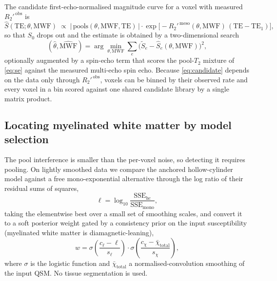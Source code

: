 \documentclass[AMA,STIX2COL,Linenumberson]{MRM}
\begin{document}
The candidate first-echo-normalised magnitude curve for a voxel with measured $R_2'^{\,\mathrm{obs}}$ is
\begin{equation}
\hat{S}(\mathrm{TE};\theta,\mathrm{MWF}) \;\propto\; \big|\,\mathrm{pools}(\theta,\mathrm{MWF},\mathrm{TE})\,\big| \cdot
\exp\!\big[-R_2'^{\,\mathrm{meso}}(\theta,\mathrm{MWF})\,(\mathrm{TE}-\mathrm{TE}_1)\big],
\label{eq:candidate}
\end{equation}
so that $S_0$ drops out and the estimate is obtained by a two-dimensional search
\begin{equation}
(\hat\theta,\widehat{\mathrm{MWF}}) = \arg\min_{\theta,\mathrm{MWF}} \sum_e \Big( \tilde{S}_e - \hat{S}_e(\theta,\mathrm{MWF}) \Big)^{2},
\label{eq:fit}
\end{equation}
optionally augmented by a spin-echo term that scores the pool-$T_2$ mixture of \eqref{eq:se} against the measured multi-echo spin echo. Because \eqref{eq:candidate} depends on the data only through $R_2'^{\,\mathrm{obs}}$, voxels can be binned by their observed rate and every voxel in a bin scored against one shared candidate library by a single matrix product.

\subsection{Locating myelinated white matter by model selection}
\label{sec:theory-wm}

The pool interference is smaller than the per-voxel noise, so detecting it requires pooling. On lightly smoothed data we compare the anchored hollow-cylinder model against a free mono-exponential alternative through the log ratio of their residual sums of squares,
\begin{equation}
\ell = \log_{10} \frac{\mathrm{SSE}_{\mathrm{hc}}}{\mathrm{SSE}_{\mathrm{mono}}},
\label{eq:lr}
\end{equation}
taking the elementwise best over a small set of smoothing scales, and convert it to a soft posterior weight gated by a consistency prior on the input susceptibility (myelinated white matter is diamagnetic-leaning),
\begin{equation}
w = \sigma\!\left(\frac{c_\ell-\ell}{s_\ell}\right)\cdot \sigma\!\left(\frac{c_\chi - \bar\chi_{\mathrm{total}}}{s_\chi}\right),
\label{eq:weight}
\end{equation}
where $\sigma$ is the logistic function and $\bar\chi_{\mathrm{total}}$ a normalised-convolution smoothing of the input QSM. No tissue segmentation is used.
\end{document}
